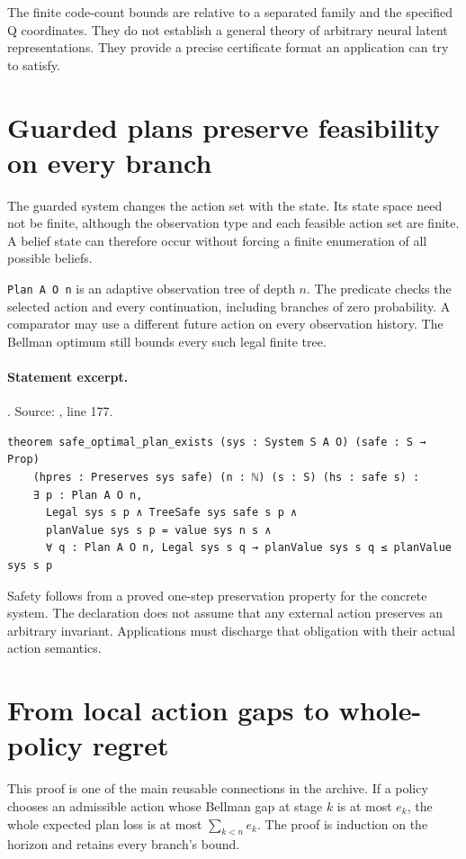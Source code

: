 \documentclass[11pt]{article}
\begin{document}
The finite code-count bounds are relative to a separated family and the
specified Q coordinates. They do not establish a general theory of arbitrary
neural latent representations. They provide a precise certificate format an
application can try to satisfy.

\section{Guarded plans preserve feasibility on every branch}
The guarded system changes the action set with the state. Its state space need
not be finite, although the observation type and each feasible action set are
finite. A belief state can therefore occur without forcing a finite enumeration
of all possible beliefs.

\texttt{Plan A O n} is an adaptive observation tree of depth $n$. The
 predicate checks the selected action and every continuation,
including branches of zero probability. A comparator may use a different
future action on every observation history. The Bellman optimum still bounds
every such legal finite tree.

\paragraph{Statement excerpt.}. Source: , line 177.
\begin{lstlisting}[style=AVOCSource]
theorem safe_optimal_plan_exists (sys : System S A O) (safe : S → Prop)
    (hpres : Preserves sys safe) (n : ℕ) (s : S) (hs : safe s) :
    ∃ p : Plan A O n,
      Legal sys s p ∧ TreeSafe sys safe s p ∧
      planValue sys s p = value sys n s ∧
      ∀ q : Plan A O n, Legal sys s q → planValue sys s q ≤ planValue sys s p
\end{lstlisting}


Safety follows from a proved one-step preservation property for the concrete
system. The declaration does not assume that any external action preserves an
arbitrary invariant. Applications must discharge that obligation with their
actual action semantics.

\section{From local action gaps to whole-policy regret}
\label{sec:regret}
This proof is one of the main reusable connections in the archive. If a policy
chooses an admissible action whose Bellman gap at stage $k$ is at most $e_k$,
the whole expected plan loss is at most $\sum_{k<n}e_k$. The proof is induction
on the horizon and retains every branch's bound.
\end{document}
